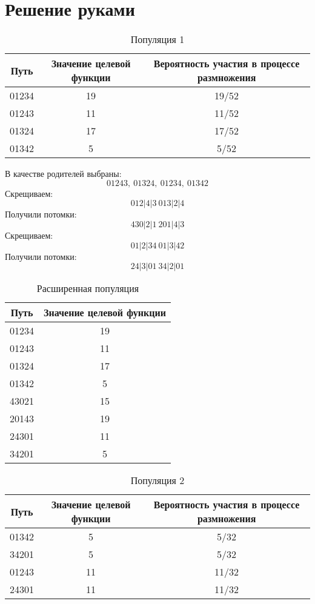 \documentclass{article}
\begin{document}
\section*{Решение руками}
\begin{table}[H]
    \centering
    \caption{Популяция 1}
    \begin{tabular}{|c|c|c|}
    \hline
    Путь& Значение целевой функции& Вероятность участия в процессе размножения\\
    \hline01234 & 19 & 19/52\\
    01243 & 11 & 11/52\\
    01324 & 17 & 17/52\\
    01342 & 5 & 5/52\\\hline
    \end{tabular}
\end{table}
В качестве родителей выбраны:
\[01243,\ 01324,\ 01234,\ 01342\]
Скрещиваем:
\[012|4|3\ 013|2|4\]
Получили потомки:
\[430|2|1\ 201|4|3\]
Скрещиваем:
\[01|2|34\ 01|3|42\]
Получили потомки:
\[24|3|01\ 34|2|01\]

\begin{table}[H]
    \centering
    \caption{Расширенная популяция}
    \begin{tabular}{|c|c|}
    \hline
    Путь& Значение целевой функции\\
    \hline
    01234 & 19\\
    01243 & 11\\
    01324 & 17\\
    01342 & 5\\
    43021 & 15\\
    20143 & 19\\
    24301 & 11\\
    34201 & 5\\
    
    \hline
    \end{tabular}
\end{table}

\begin{table}[H]
    \centering
    \caption{Популяция 2}
    \begin{tabular}{|c|c|c|}
    \hline
    Путь& Значение целевой функции& Вероятность участия в процессе размножения\\
    \hline
    01342 & 5 & 5/32\\
    34201 & 5 & 5/32\\
    01243 & 11 & 11/32\\
    24301 & 11 & 11/32\\\hline
    \end{tabular}
\end{table}
\end{document}
